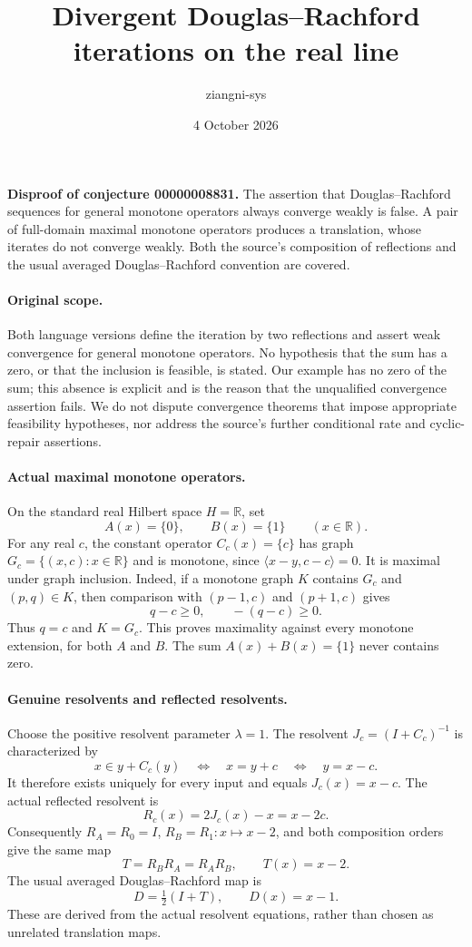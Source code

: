 \documentclass[11pt]{article}
\title{Divergent Douglas--Rachford iterations on the real line}
\author{ziangni-sys}
\date{4 October 2026}
\begin{document}
\raggedright
\maketitle
\noindent\textbf{Disproof of conjecture 00000008831.}
The assertion that Douglas--Rachford sequences for general monotone operators always converge weakly is false. A pair of full-domain maximal monotone operators produces a translation, whose iterates do not converge weakly. Both the source's composition of reflections and the usual averaged Douglas--Rachford convention are covered.

\paragraph{Original scope.}
Both language versions define the iteration by two reflections and assert weak convergence for general monotone operators. No hypothesis that the sum has a zero, or that the inclusion is feasible, is stated. Our example has no zero of the sum; this absence is explicit and is the reason that the unqualified convergence assertion fails. We do not dispute convergence theorems that impose appropriate feasibility hypotheses, nor address the source's further conditional rate and cyclic-repair assertions.

\paragraph{Actual maximal monotone operators.}
On the standard real Hilbert space $H=\mathbb R$, set
\[
 A(x)=\{0\},\qquad B(x)=\{1\}\qquad(x\in\mathbb R).
\]
For any real $c$, the constant operator $C_c(x)=\{c\}$ has graph
$G_c=\{(x,c):x\in\mathbb R\}$ and is monotone, since
$\langle x-y,c-c\rangle=0$.
It is maximal under graph inclusion. Indeed, if a monotone graph $K$ contains $G_c$ and $(p,q)\in K$, then comparison with $(p-1,c)$ and $(p+1,c)$ gives
\[
 q-c\geq0,\qquad -(q-c)\geq0.
\]
Thus $q=c$ and $K=G_c$. This proves maximality against every monotone extension, for both $A$ and $B$. The sum $A(x)+B(x)=\{1\}$ never contains zero.

\paragraph{Genuine resolvents and reflected resolvents.}
Choose the positive resolvent parameter $\lambda=1$.
The resolvent $J_c=(I+C_c)^{-1}$ is characterized by
\[
 x\in y+C_c(y)\quad\Longleftrightarrow\quad x=y+c
 \quad\Longleftrightarrow\quad y=x-c.
\]
It therefore exists uniquely for every input and equals $J_c(x)=x-c$.
The actual reflected resolvent is
\[
 R_c(x)=2J_c(x)-x=x-2c.
\]
Consequently $R_A=R_0=I$, $R_B=R_1:x\mapsto x-2$, and both composition orders give the same map
\[
 T=R_B R_A=R_A R_B,\qquad T(x)=x-2.
\]
The usual averaged Douglas--Rachford map is
\[
 D=\tfrac12(I+T),\qquad D(x)=x-1.
\]
These are derived from the actual resolvent equations, rather than chosen as unrelated translation maps.
\end{document}

